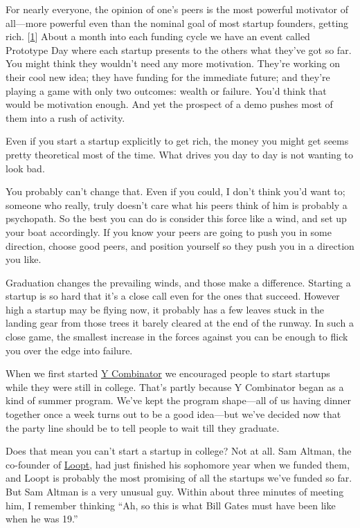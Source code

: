 For nearly everyone, the opinion of one's peers is the most powerful
motivator of all---more powerful even than the nominal goal of most
startup founders, getting rich. {[}\hyperref[f1n]{1}{]} About a month
into each funding cycle we have an event called Prototype Day where each
startup presents to the others what they've got so far. You might think
they wouldn't need any more motivation. They're working on their cool
new idea; they have funding for the immediate future; and they're
playing a game with only two outcomes: wealth or failure. You'd think
that would be motivation enough. And yet the prospect of a demo pushes
most of them into a rush of activity.

Even if you start a startup explicitly to get rich, the money you might
get seems pretty theoretical most of the time. What drives you day to
day is not wanting to look bad.

You probably can't change that. Even if you could, I don't think you'd
want to; someone who really, truly doesn't care what his peers think of
him is probably a psychopath. So the best you can do is consider this
force like a wind, and set up your boat accordingly. If you know your
peers are going to push you in some direction, choose good peers, and
position yourself so they push you in a direction you like.

Graduation changes the prevailing winds, and those make a difference.
Starting a startup is so hard that it's a close call even for the ones
that succeed. However high a startup may be flying now, it probably has
a few leaves stuck in the landing gear from those trees it barely
cleared at the end of the runway. In such a close game, the smallest
increase in the forces against you can be enough to flick you over the
edge into failure.

When we first started \href{http://ycombinator.com}{Y Combinator} we
encouraged people to start startups while they were still in college.
That's partly because Y Combinator began as a kind of summer program.
We've kept the program shape---all of us having dinner together once a
week turns out to be a good idea---but we've decided now that the party
line should be to tell people to wait till they graduate.

Does that mean you can't start a startup in college? Not at all. Sam
Altman, the co-founder of \href{http://loopt.com}{Loopt}, had just
finished his sophomore year when we funded them, and Loopt is probably
the most promising of all the startups we've funded so far. But Sam
Altman is a very unusual guy. Within about three minutes of meeting him,
I remember thinking ``Ah, so this is what Bill Gates must have been like
when he was 19.''

